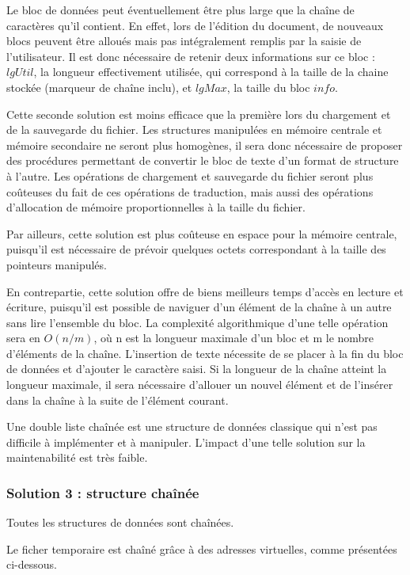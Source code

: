 Le bloc de données peut éventuellement être plus large que la chaîne de
caractères qu'il contient. En effet, lors de l'édition du document, de nouveaux
blocs peuvent être alloués mais pas intégralement remplis par la saisie de
l'utilisateur. Il est donc nécessaire de retenir deux informations sur ce bloc
: $lgUtil$, la longueur effectivement utilisée, qui correspond à la taille de
la chaine stockée (marqueur de chaîne inclu),  et $lgMax$, la taille du bloc
$info$.

Cette seconde solution est moins efficace que la première lors du chargement et
de la sauvegarde du fichier. Les structures manipulées en mémoire centrale et
mémoire secondaire ne seront plus homogènes, il sera donc nécessaire de
proposer des procédures permettant de convertir le bloc de texte d'un format de
structure à l'autre. Les opérations de chargement et sauvegarde du fichier
seront plus coûteuses du fait de ces opérations de traduction, mais aussi des
opérations d'allocation de mémoire proportionnelles à la taille du fichier.

Par ailleurs, cette solution est plus coûteuse en espace pour la mémoire
centrale, puisqu'il est nécessaire de prévoir quelques octets correspondant à
la taille des pointeurs manipulés.

En contrepartie, cette solution offre de biens meilleurs temps d'accès en
lecture et écriture, puisqu'il est possible de naviguer d'un élément de la
chaîne à un autre sans lire l'ensemble du bloc. La complexité algorithmique
d'une telle opération sera en $O(n/m)$, où n est la longueur maximale d'un bloc
et m le nombre d'éléments de la chaîne. L'insertion de texte nécessite de se
placer à la fin du bloc de données et d'ajouter le caractère saisi. Si la
longueur de la chaîne atteint la longueur maximale, il sera nécessaire
d'allouer un nouvel élément et de l'insérer dans la chaîne à la suite de
l'élément courant.

Une double liste chaînée est une structure de données classique qui n'est pas
difficile à implémenter et à manipuler. L'impact d'une telle solution sur la
maintenabilité est très faible.

\subsubsection{Solution 3 : structure chaînée}
Toutes les structures de données sont chaînées.

Le ficher temporaire est chaîné grâce à des adresses virtuelles, comme présentées ci-dessous.

